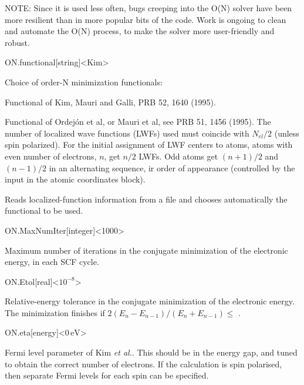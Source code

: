 NOTE: Since it is used less often, bugs creeping into the O(N) solver have
been more resilient than in more popular bits of the code.  Work is
ongoing to clean and automate the O(N) process, to make the solver
more user-friendly and robust.

\begin{fdfentry}{ON.functional}[string]<Kim>
  
  Choice of order-N minimization functionals:
  \begin{fdfoptions}
    \option[Kim]%
    Functional of Kim, Mauri and Galli, PRB 52, 1640 (1995).

    Functional of Ordej\'on et al, or Mauri et al, see PRB 51, 1456
    (1995).  The number of localized wave functions (LWFs) used must
    coincide with $N_{el}/2$ (unless spin polarized).  For the initial
    assignment of LWF centers to atoms, atoms with even number of
    electrons, $n$, get $n/2$ LWFs. Odd atoms get $(n+1)/2$ and
    $(n-1)/2$ in an alternating sequence, ir order of appearance
    (controlled by the input in the atomic coordinates block).

    \option[files]%
    Reads localized-function information from a file and chooses
    automatically the functional to be used.
  \end{fdfoptions}

\end{fdfentry}

\begin{fdfentry}{ON.MaxNumIter}[integer]<1000>
  
  Maximum number of iterations in the conjugate minimization of the
  electronic energy, in each SCF cycle.

\end{fdfentry}

\begin{fdfentry}{ON.Etol}[real]<$10^{-8}$>
  
  Relative-energy tolerance in the conjugate minimization of the
  electronic energy. The minimization finishes if 
  $2 (E_n - E_{n-1}) / (E_n + E_{n-1}) \leq $ .

\end{fdfentry}

\begin{fdfentry}{ON.eta}[energy]<$0\,\mathrm{eV}$>

  Fermi level parameter of Kim \textit{et al.}. This should be in the
  energy gap, and tuned to obtain the correct number of electrons. If
  the calculation is spin polarised, then separate Fermi levels for
  each spin can be specified.
  
\end{fdfentry}

